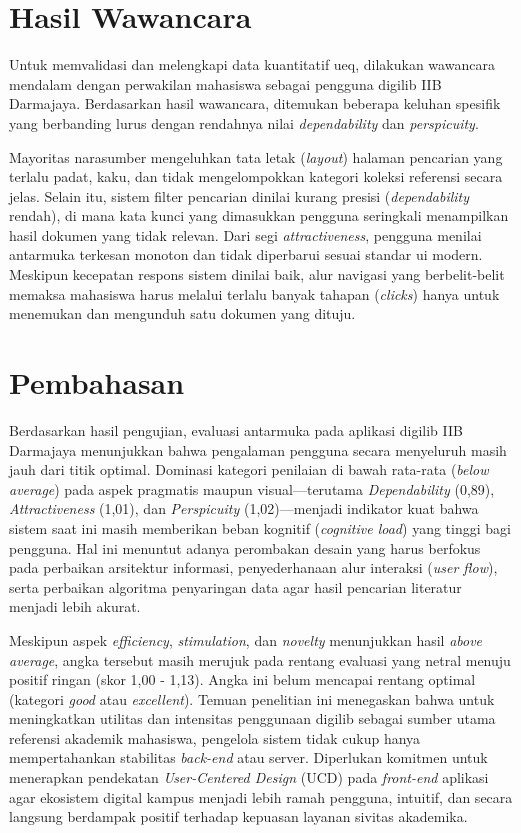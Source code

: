\section{Hasil Wawancara}
Untuk memvalidasi dan melengkapi data kuantitatif \gls{ueq}, dilakukan wawancara mendalam dengan perwakilan mahasiswa sebagai pengguna \gls{digilib} IIB Darmajaya. Berdasarkan hasil wawancara, ditemukan beberapa keluhan spesifik yang berbanding lurus dengan rendahnya nilai \textit{dependability} dan \textit{perspicuity}.

Mayoritas narasumber mengeluhkan tata letak (\textit{layout}) halaman pencarian yang terlalu padat, kaku, dan tidak mengelompokkan kategori koleksi referensi secara jelas. Selain itu, sistem filter pencarian dinilai kurang presisi (\textit{dependability} rendah), di mana kata kunci yang dimasukkan pengguna seringkali menampilkan hasil dokumen yang tidak relevan. Dari segi \textit{attractiveness}, pengguna menilai antarmuka terkesan monoton dan tidak diperbarui sesuai standar \gls{ui} modern. Meskipun kecepatan respons sistem dinilai baik, alur navigasi yang berbelit-belit memaksa mahasiswa harus melalui terlalu banyak tahapan (\textit{clicks}) hanya untuk menemukan dan mengunduh satu dokumen yang dituju.

\section{Pembahasan}
Berdasarkan hasil pengujian, evaluasi antarmuka pada aplikasi \gls{digilib} IIB Darmajaya menunjukkan bahwa pengalaman pengguna secara menyeluruh masih jauh dari titik optimal. Dominasi kategori penilaian di bawah rata-rata (\textit{below average}) pada aspek pragmatis maupun visual---terutama \textit{Dependability} (0,89), \textit{Attractiveness} (1,01), dan \textit{Perspicuity} (1,02)---menjadi indikator kuat bahwa sistem saat ini masih memberikan beban kognitif (\textit{cognitive load}) yang tinggi bagi pengguna. Hal ini menuntut adanya perombakan desain yang harus berfokus pada perbaikan arsitektur informasi, penyederhanaan alur interaksi (\textit{user flow}), serta perbaikan algoritma penyaringan data agar hasil pencarian literatur menjadi lebih akurat.

Meskipun aspek \textit{efficiency}, \textit{stimulation}, dan \textit{novelty} menunjukkan hasil \textit{above average}, angka tersebut masih merujuk pada rentang evaluasi yang netral menuju positif ringan (skor 1,00 - 1,13). Angka ini belum mencapai rentang optimal (kategori \textit{good} atau \textit{excellent}). Temuan penelitian ini menegaskan bahwa untuk meningkatkan utilitas dan intensitas penggunaan \gls{digilib} sebagai sumber utama referensi akademik mahasiswa, pengelola sistem tidak cukup hanya mempertahankan stabilitas \textit{back-end} atau server. Diperlukan komitmen untuk menerapkan pendekatan \textit{User-Centered Design} (UCD) pada \textit{front-end} aplikasi agar ekosistem digital kampus menjadi lebih ramah pengguna, intuitif, dan secara langsung berdampak positif terhadap kepuasan layanan sivitas akademika.